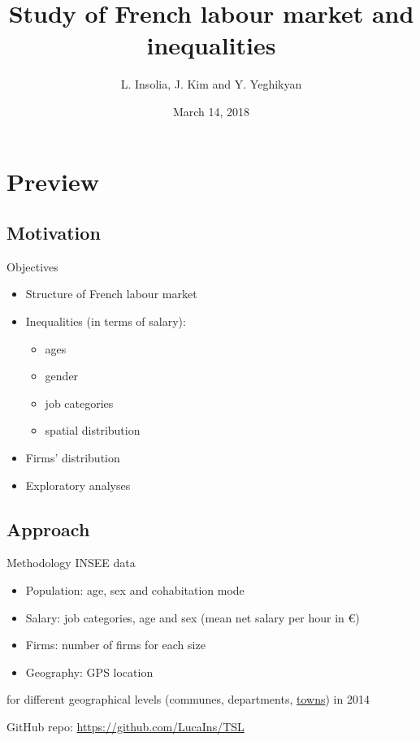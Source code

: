 \documentclass[12pt]{beamer}
\title[Study of French labour market and inequalities]{Study of French labour market and inequalities}
\author{L. Insolia, J. Kim and Y. Yeghikyan}
\institute{SNS \\
		   \vskip0.5cm\centering\small \textcolor{rscuro}{--- \emph{Midterm results} ---}}
\date{March 14, 2018}
\begin{document}
	
\begin{frame}
	
	\maketitle
\end{frame}


\section{Preview}

\subsection{Motivation}

\begin{frame}{\textcolor{bscuro}{Objectives}}
	\begin{itemize}
		\item Structure of French labour market 
		\item Inequalities (in terms of salary): 
		\begin{itemize}
			\item ages 
			\item gender
			\item job categories
			\item spatial distribution
		\end{itemize}
		\item Firms' distribution
		\item Exploratory analyses
	\end{itemize}
\end{frame}
		

\subsection{Approach}

\begin{frame}{\textcolor{bscuro}{Methodology}}
	INSEE data
	\begin{itemize}
		\item Population: age, sex and cohabitation mode
		\item Salary: job categories, age and sex (mean net salary per hour in \euro)
		\item Firms: number of firms for each size
		\item Geography: GPS location
	\end{itemize}
	for different geographical levels (communes, departments, \underline{towns}) in 2014
	
	
	\vskip1cm GitHub repo: \textcolor{bscuro}{\url{https://github.com/LucaIns/TSL}}
\end{frame}
				
\end{document}
